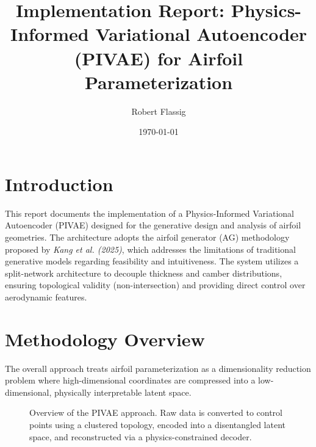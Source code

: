 \documentclass[11pt, a4paper]{article}
\title{\textbf{Implementation Report: Physics-Informed Variational Autoencoder (PIVAE) for Airfoil Parameterization}}
\author{Robert Flassig}
\date{\today}
\begin{document}
\maketitle

\section{Introduction}
This report documents the implementation of a Physics-Informed Variational Autoencoder (PIVAE) designed for the generative design and analysis of airfoil geometries. The architecture adopts the airfoil generator (AG) methodology proposed by \emph{Kang et al. (2025)}, which addresses the limitations of traditional generative models regarding feasibility and intuitiveness. The system utilizes a split-network architecture to decouple thickness and camber distributions, ensuring topological validity (non-intersection) and providing direct control over aerodynamic features.

\section{Methodology Overview}

The overall approach treats airfoil parameterization as a dimensionality reduction problem where high-dimensional coordinates are compressed into a low-dimensional, physically interpretable latent space.

\begin{figure}[H]
    \centering
    \caption{Overview of the PIVAE approach. Raw data is converted to control points using a clustered topology, encoded into a disentangled latent space, and reconstructed via a physics-constrained decoder.}
    \label{fig:overview}
\end{figure}
\end{document}
